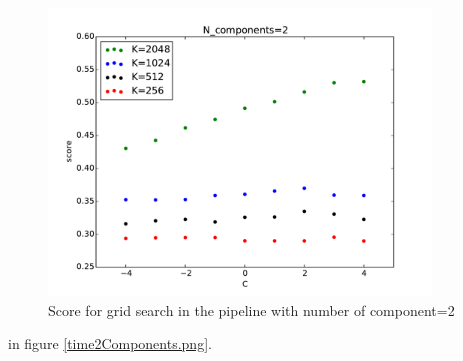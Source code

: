 \documentclass[]{article}
\begin{document}
\begin{center}\label{2compPlot}
\begin{figure}\caption{Score for grid search in the pipeline with number of component=2}\label{score2Components.png}
\includegraphics[height=3.0in]{plots/score2Components.pdf}
\end{figure}
\end{center}

in figure \ref{time2Components.png}.











\newpage




\end{document}
